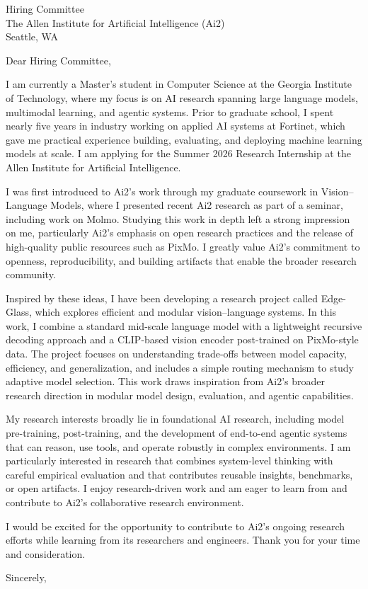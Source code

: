 \documentclass[11pt]{letter}
\begin{document}
\begin{letter}{Hiring Committee\\
The Allen Institute for Artificial Intelligence (Ai2)\\
Seattle, WA}

\opening{Dear Hiring Committee,}

I am currently a Master’s student in Computer Science at the Georgia Institute of Technology, where my focus is on AI research spanning large language models, multimodal learning, and agentic systems. Prior to graduate school, I spent nearly five years in industry working on applied AI systems at Fortinet, which gave me practical experience building, evaluating, and deploying machine learning models at scale. I am applying for the Summer 2026 Research Internship at the Allen Institute for Artificial Intelligence.

I was first introduced to Ai2’s work through my graduate coursework in Vision--Language Models, where I presented recent Ai2 research as part of a seminar, including work on Molmo. Studying this work in depth left a strong impression on me, particularly Ai2’s emphasis on open research practices and the release of high-quality public resources such as PixMo. I greatly value Ai2’s commitment to openness, reproducibility, and building artifacts that enable the broader research community.

Inspired by these ideas, I have been developing a research project called Edge-Glass, which explores efficient and modular vision--language systems. In this work, I combine a standard mid-scale language model with a lightweight recursive decoding approach and a CLIP-based vision encoder post-trained on PixMo-style data. The project focuses on understanding trade-offs between model capacity, efficiency, and generalization, and includes a simple routing mechanism to study adaptive model selection. This work draws inspiration from Ai2’s broader research direction in modular model design, evaluation, and agentic capabilities.

My research interests broadly lie in foundational AI research, including model pre-training, post-training, and the development of end-to-end agentic systems that can reason, use tools, and operate robustly in complex environments. I am particularly interested in research that combines system-level thinking with careful empirical evaluation and that contributes reusable insights, benchmarks, or open artifacts. I enjoy research-driven work and am eager to learn from and contribute to Ai2’s collaborative research environment.

I would be excited for the opportunity to contribute to Ai2’s ongoing research efforts while learning from its researchers and engineers. Thank you for your time and consideration.

\closing{Sincerely,}

\end{letter}
\end{document}
